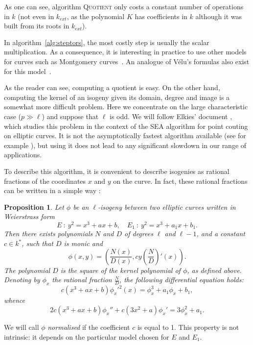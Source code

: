 \documentclass{article}
\newcommand{\algstyle}[1]{\textsc{#1}}
\renewcommand{\v}{\vspace{5mm}}
\newtheorem{prop}[theorem]{Proposition}
\theoremstyle{definition}
\begin{document}
As one can see, algorithm \algstyle{Quotient} only costs a constant number
of operations in $k$ (not even in $k_{ext}$, as the polynomial $K$ has
coefficients in $k$ although it was built from its roots in $k_{ext}$).

In algorithm~\ref{alg:steptors}, the most costly step is usually the
scalar multiplication. As a consequence, it is interesting in practice
to use other models for curves such as Montgomery curves~\cite{}.
An analogue of Vélu's formulas also exist for this model~\cite{}.

\v

As the reader can see, computing a quotient is easy. On the other hand,
computing the kernel of an isogeny given its domain, degree and image is a
somewhat more difficult problem. Here we concentrate on the large
characteristic case ($p\gg\ell$) and suppose that $\ell$ is odd.
We will follow Elkies' document \cite{}, which studies
this problem in the context of the SEA algorithm for point couting on
elliptic curves. It is not the asymptotically fastest algorithm available
(see for example \cite{}),
but using it does not lead to any significant slowdown in our range of applications.

To describe this algorithm, it is convenient to describe isogenies as
rational fractions of the coordinates $x$ and $y$ on the curve. In fact, these
rational fractions can be written in a simple way \cite{}:

\begin{prop}
Let $\phi$ be an $\ell$-isogeny between two elliptic curves written in
Weierstrass form
\[
E\ :\ y^2 = x^3 + ax + b, \quad E_1\ :\ y^2 = x^3 + a_1x + b_1.
\]
Then there exists polynomials $N$ and $D$ of degrees $\ell$ and $\ell-1$,
and a constant $c\in k^*$, such that $D$ is monic and
\[
\phi(x, y) = \left(\frac{N(x)}{D(x)}, cy\left(\frac{N}{D}\right)'(x)\right).
\]
The polynomial $D$ is the square of the kernel polynomial of $\phi$, as defined
above. Denoting by $\phi_x$ the rational fraction $\frac{N}{D}$,
the following differential equation holds:
\[
c(x^3 + ax + b)\phi_x'^2(x) = \phi_x^3 + a_1\phi_x + b_1,
\]
whence
\begin{equation}
\label{diffeq}
2c(x^3 + ax + b)\phi_x'' + c(3x^2 + a)\phi_x' =
 3\phi_x^2 + a_1.
\end{equation}
\end{prop}

We will call $\phi$ \emph{normalised} if the coefficient $c$ is equal to 1.
This property is not intrinsic: it depends on the particular model chosen
for $E$ and $E_1$.
\end{document}
